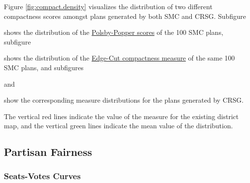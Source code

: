 Figure \ref{fig:compact.density} visualizes the distribution of two different compactness scores amongst plans generated by both SMC and CRSG. Subfigure
\begin{seriate} 
    \item shows the distribution of the \hyperref[sec:polsbypopper]{Polsby-Popper scores} of the 100 SMC plans, subfigure
    \item shows the distribution of the \hyperref[sec:edgecut]{Edge-Cut compactness measure} of the same 100 SMC plans, and subfigures
    \item and 
    \item show the corresponding measure distributions for the plans generated by CRSG. 
\end{seriate}
The vertical red lines indicate the value of the measure for the existing district map, and the vertical green lines indicate the mean value of the distribution. 

\subsection{Partisan Fairness}

\subsubsection{Seats-Votes Curves}

